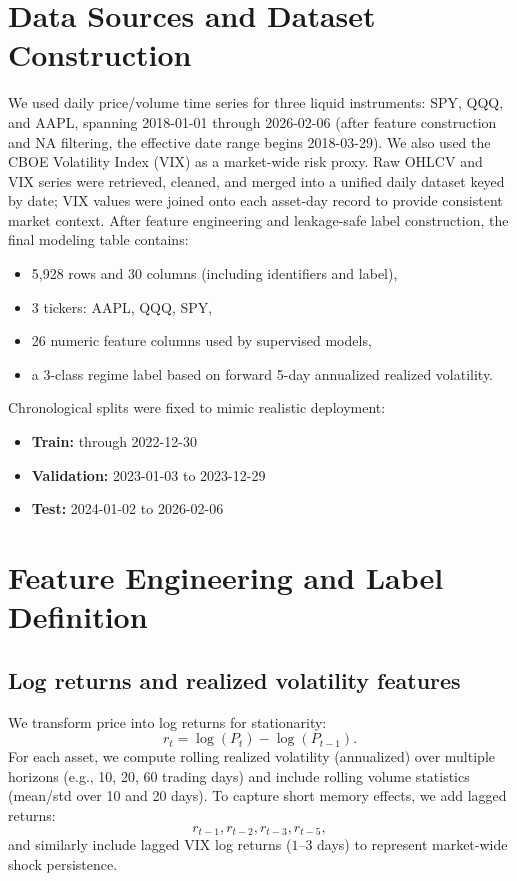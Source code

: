 \documentclass[11pt]{article}
\begin{document}
\section{Data Sources and Dataset Construction}
We used daily price/volume time series for three liquid instruments: SPY, QQQ, and AAPL, spanning 2018-01-01 through 2026-02-06 (after feature construction and NA filtering, the effective date range begins 2018-03-29). We also used the CBOE Volatility Index (VIX) as a market-wide risk proxy. Raw OHLCV and VIX series were retrieved, cleaned, and merged into a unified daily dataset keyed by date; VIX values were joined onto each asset-day record to provide consistent market context.
After feature engineering and leakage-safe label construction, the final modeling table contains:
\begin{itemize}
    \item 5{,}928 rows and 30 columns (including identifiers and label),
    \item 3 tickers: AAPL, QQQ, SPY,
    \item 26 numeric feature columns used by supervised models,
    \item a 3-class regime label based on forward 5-day annualized realized volatility.
\end{itemize}

Chronological splits were fixed to mimic realistic deployment:
\begin{itemize}
    \item \textbf{Train:} through 2022-12-30
    \item \textbf{Validation:} 2023-01-03 to 2023-12-29
    \item \textbf{Test:} 2024-01-02 to 2026-02-06
\end{itemize}

\section{Feature Engineering and Label Definition}
\subsection{Log returns and realized volatility features}
We transform price into log returns for stationarity:
\[
r_t = \log(P_t) - \log(P_{t-1}).
\]
For each asset, we compute rolling realized volatility (annualized) over multiple horizons (e.g., 10, 20, 60 trading days) and include rolling volume statistics (mean/std over 10 and 20 days). To capture short memory effects, we add lagged returns:
\[
r_{t-1}, r_{t-2}, r_{t-3}, r_{t-5},
\]
and similarly include lagged VIX log returns ($1$--$3$ days) to represent market-wide shock persistence.
\end{document}

